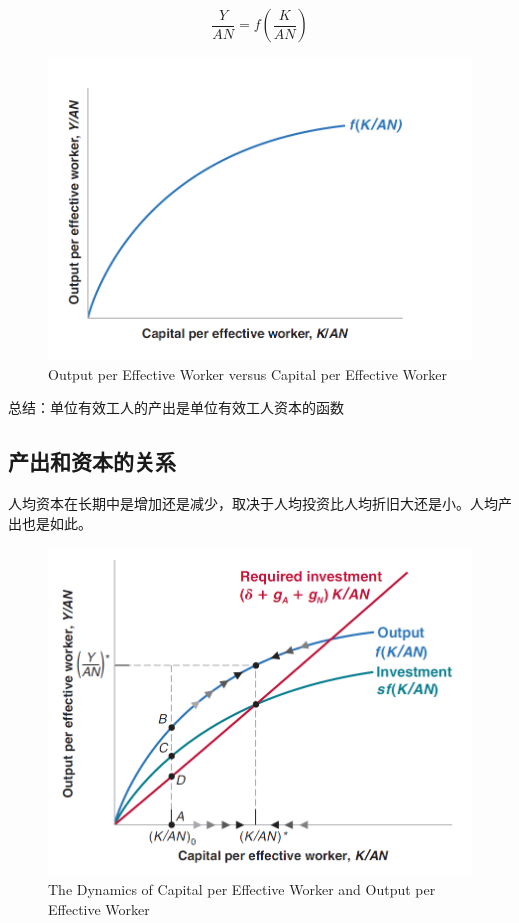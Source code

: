 \documentclass{article}
\begin{document}
\[
\frac{Y}{AN}=f(\frac{K}{AN})
\]

\begin{figure}[H] %
	\centering %
	\includegraphics[width=1\textwidth]{12_1} %
	\caption{Output per Effective
		Worker versus Capital per
		Effective Worker} %
	\label{Fig.main2} %
\end{figure}

总结：单位有效工人的产出是单位有效工人资本的函数

\subsection{产出和资本的关系}

人均资本在长期中是增加还是减少，取决于人均投资比人均折旧大还是小。人均产出也是如此。

\begin{figure}[H] %
	\centering %
	\includegraphics[width=1\textwidth]{12_2} %
	\caption{The Dynamics of Capital
		per Effective Worker
		and Output per Effective
		Worker} %
	\label{Fig.main3} %
\end{figure}
\end{document}
